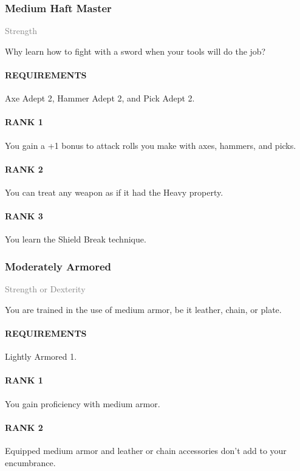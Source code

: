 \subsubsection{Medium Haft Master} \label{feat::mediumhaftmaster}
\small{\textcolor{gray}{Strength}}

\normalsize
Why learn how to fight with a sword when your tools will do the job?
\paragraph{REQUIREMENTS} Axe Adept 2, Hammer Adept 2, and Pick Adept 2.
\paragraph{RANK 1} You gain a +1 bonus to attack rolls you make with axes, hammers, and picks.
\paragraph{RANK 2} You can treat any weapon as if it had the Heavy property.
\paragraph{RANK 3} You learn the Shield Break technique.

\subsubsection{Moderately Armored} \label{feat::moderatelyarmored}
\small{\textcolor{gray}{Strength or Dexterity}}

\normalsize
You are trained in the use of medium armor, be it leather, chain, or plate.
\paragraph{REQUIREMENTS} Lightly Armored 1.
\paragraph{RANK 1} You gain proficiency with medium armor.
\paragraph{RANK 2} Equipped medium armor and leather or chain accessories don't add to your encumbrance.
